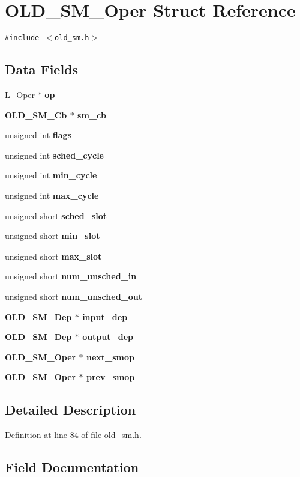 \section{OLD\_\-SM\_\-Oper Struct Reference}
\label{structOLD__SM__Oper}
{\tt \#include $<$old\_\-sm.h$>$}

\subsection*{Data Fields}
\begin{CompactItemize}
\item 
L\_\-Oper $\ast$ \bf{op}
\item 
\bf{OLD\_\-SM\_\-Cb} $\ast$ \bf{sm\_\-cb}
\item 
unsigned int \bf{flags}
\item 
unsigned int \bf{sched\_\-cycle}
\item 
unsigned int \bf{min\_\-cycle}
\item 
unsigned int \bf{max\_\-cycle}
\item 
unsigned short \bf{sched\_\-slot}
\item 
unsigned short \bf{min\_\-slot}
\item 
unsigned short \bf{max\_\-slot}
\item 
unsigned short \bf{num\_\-unsched\_\-in}
\item 
unsigned short \bf{num\_\-unsched\_\-out}
\item 
\bf{OLD\_\-SM\_\-Dep} $\ast$ \bf{input\_\-dep}
\item 
\bf{OLD\_\-SM\_\-Dep} $\ast$ \bf{output\_\-dep}
\item 
\bf{OLD\_\-SM\_\-Oper} $\ast$ \bf{next\_\-smop}
\item 
\bf{OLD\_\-SM\_\-Oper} $\ast$ \bf{prev\_\-smop}
\end{CompactItemize}


\subsection{Detailed Description}




Definition at line 84 of file old\_\-sm.h.

\subsection{Field Documentation}
